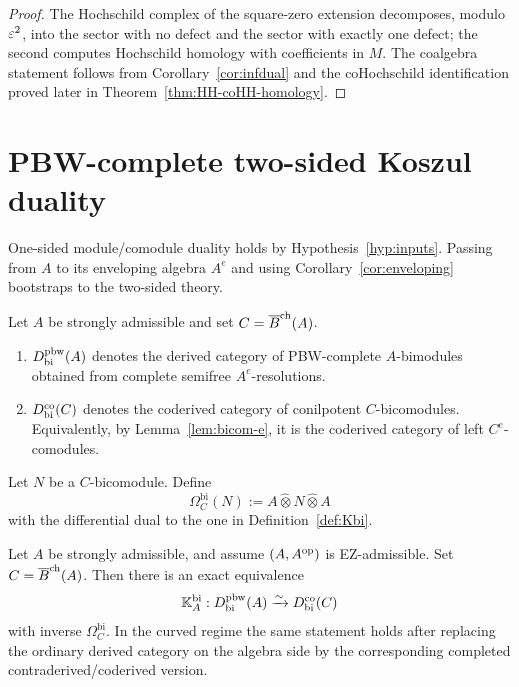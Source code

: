 \begin{proof}
The Hochschild complex of the square-zero extension decomposes, modulo $\varepsilon^2$, into the sector with
no defect and the sector with exactly one defect; the second computes Hochschild homology with
coefficients in $M$. The coalgebra statement follows from
Corollary~\ref{cor:infdual} and the coHochschild identification proved later in
Theorem~\ref{thm:HH-coHH-homology}.
\end{proof}

\section{PBW-complete two-sided Koszul duality}
\label{sec:bimod-bicomod}

One-sided module/comodule duality holds by Hypothesis~\ref{hyp:inputs}.
Passing from $A$ to its enveloping algebra $A^e$ and using
Corollary~\ref{cor:enveloping} bootstraps to the two-sided theory.

\begin{definition}
Let $A$ be strongly admissible and set $C=\overline{B}^{\mathrm{ch}}(A)$.
\begin{enumerate}[label=(\alph*)]
\item $D^{\mathrm{pbw}}_{\mathrm{bi}}(A)$ denotes the derived category of PBW-complete $A$-bimodules obtained
from complete semifree $A^e$-resolutions.

\item $D^{\mathrm{co}}_{\mathrm{bi}}(C)$ denotes the coderived category of conilpotent $C$-bicomodules.
Equivalently, by Lemma~\ref{lem:bicom-e}, it is the coderived category of left $C^e$-comodules.
\end{enumerate}
\end{definition}

\begin{definition}
Let $N$ be a $C$-bicomodule. Define
\[
\Omega_C^{\mathrm{bi}}(N):=A\widehat\otimes N\widehat\otimes A
\]
with the differential dual to the one in Definition~\ref{def:Kbi}.
\end{definition}

\begin{theorem}
\label{thm:bimod-bicomod}
Let $A$ be strongly admissible, and assume $(A,A^{\mathrm{op}})$ is EZ-admissible.
Set $C=\overline{B}^{\mathrm{ch}}(A)$.
Then there is an exact equivalence
\[
\mathbb{K}_A^{\mathrm{bi}}:D^{\mathrm{pbw}}_{\mathrm{bi}}(A)\xrightarrow{\sim}D^{\mathrm{co}}_{\mathrm{bi}}(C)
\]
with inverse $\Omega_C^{\mathrm{bi}}$. In the curved regime the same statement holds after replacing
the ordinary derived category on the algebra side by the corresponding completed
contra\-derived/coderived version.
\end{theorem}

